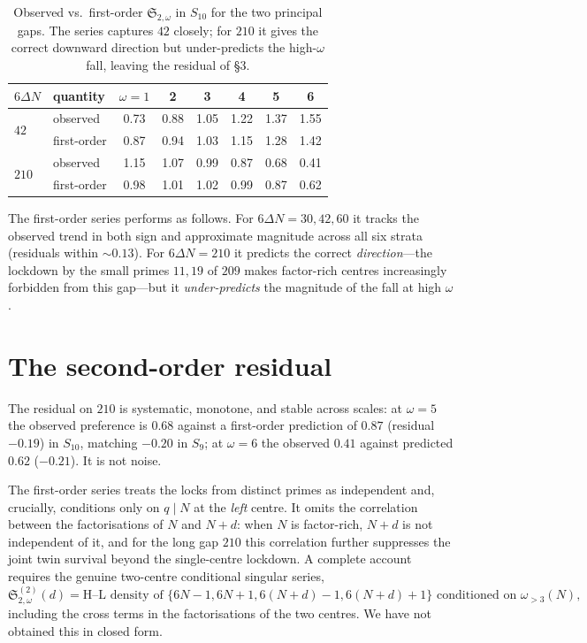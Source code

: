 \documentclass[11pt]{article}
\begin{document}
\begin{table}[h]\centering
\begin{tabular}{llcccccc}
\toprule
$6\Delta N$ & quantity & $\omega{=}1$ & 2 & 3 & 4 & 5 & 6\\
\midrule
\multirow{2}{*}{$42$}  & observed   & 0.73 & 0.88 & 1.05 & 1.22 & 1.37 & 1.55\\
                       & first-order& 0.87 & 0.94 & 1.03 & 1.15 & 1.28 & 1.42\\
\midrule
\multirow{2}{*}{$210$} & observed   & 1.15 & 1.07 & 0.99 & 0.87 & 0.68 & 0.41\\
                       & first-order& 0.98 & 1.01 & 1.02 & 0.99 & 0.87 & 0.62\\
\bottomrule
\end{tabular}
\caption{Observed vs.\ first-order $\mathfrak{S}_{2,\omega}$ in $S_{10}$ for the
two principal gaps. The series captures $42$ closely; for $210$ it gives the
correct downward direction but under-predicts the high-$\omega$ fall, leaving the
residual of \S3.}
\label{tab:css}
\end{table}

The first-order series performs as follows. For $6\Delta N=30,42,60$ it tracks
the observed trend in both sign and approximate magnitude across all six strata
(residuals within $\sim0.13$). For $6\Delta N=210$ it predicts the correct
\emph{direction}---the lockdown by the small primes $11,19$ of $209$ makes
factor-rich centres increasingly forbidden from this gap---but it
\emph{under-predicts} the magnitude of the fall at high $\omega$.

\section{The second-order residual}

The residual on $210$ is systematic, monotone, and stable across scales: at
$\omega=5$ the observed preference is $0.68$ against a first-order prediction of
$0.87$ (residual $-0.19$) in $S_{10}$, matching $-0.20$ in $S_9$; at $\omega=6$
the observed $0.41$ against predicted $0.62$ ($-0.21$). It is not noise.

The first-order series treats the locks from distinct primes as independent and,
crucially, conditions only on $q\mid N$ at the \emph{left} centre. It omits the
correlation between the factorisations of $N$ and $N+d$: when $N$ is factor-rich,
$N+d$ is not independent of it, and for the long gap $210$ this correlation
further suppresses the joint twin survival beyond the single-centre lockdown.
A complete account requires the genuine two-centre conditional singular series,
\[
  \mathfrak{S}^{(2)}_{2,\omega}(d)=
  \text{H--L density of }\{6N\!-\!1,6N\!+\!1,6(N\!+\!d)\!-\!1,6(N\!+\!d)\!+\!1\}
  \text{ conditioned on }\omega_{>3}(N),
\]
including the cross terms in the factorisations of the two centres. We have not
obtained this in closed form.
\end{document}

